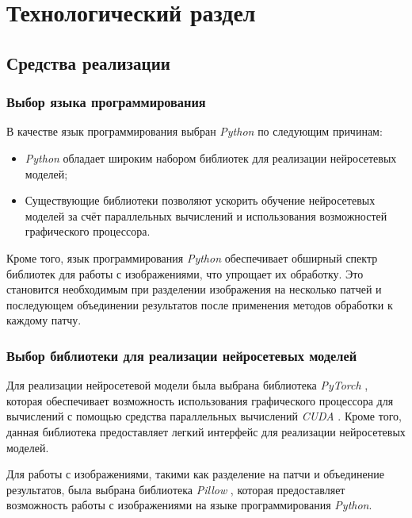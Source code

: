 \chapter{Технологический раздел}

\section{Средства реализации}
\subsection{Выбор языка программирования}

В качестве язык программирования выбран \textit{Python} \cite{python} по следующим причинам:

\begin{itemize}
    \item \textit{Python} обладает широким набором библиотек для реализации нейросетевых моделей;
    \item Существующие библиотеки позволяют ускорить обучение нейросетевых моделей за счёт параллельных вычислений и использования возможностей графического процессора.
\end{itemize}

Кроме того, язык программирования \textit{Python} обеспечивает обширный спектр библиотек для работы с изображениями, что упрощает их обработку. Это становится необходимым при разделении изображения на несколько патчей и последующем объединении результатов после применения методов обработки к каждому патчу.

\subsection{Выбор библиотеки для реализации нейросетевых моделей}

Для реализации нейросетевой модели была выбрана библиотека \textit{PyTorch} \cite{paszke2019pytorch}, которая обеспечивает возможность использования графического процессора для вычислений с помощью средства параллельных вычислений \textit{CUDA} \cite{nvidia2011cuda}. Кроме того, данная библиотека предоставляет легкий интерфейс для реализации нейросетевых моделей.

Для работы с изображениями, такими как разделение на патчи и объединение результатов, была выбрана библиотека \textit{Pillow} \cite{clark2002python}, которая предоставляет возможность работы с изображениями на языке программирования \textit{Python}.

